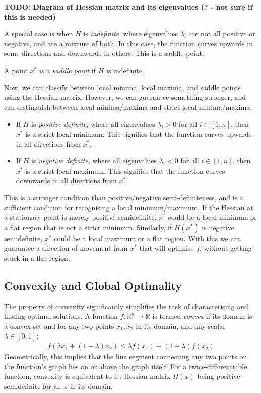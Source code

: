\textbf{TODO: Diagram of Hessian matrix and its eigenvalues (? - not sure if this is needed)}

A special case is when $H$ is \textit{indefinite}, where eigenvalues $\lambda_i$ are not all positive or negative, and are a mixture of both. In this case, the function curves upwards in some directions and downwards in others. This is a saddle point.

\begin{definition}
    A point $x^*$ is a \textit{saddle point} if $H$ is indefinite.
\end{definition}

Now, we can classify between local minima, local maxima, and saddle points using the Hessian matrix. However, we can guarantee something stronger, and can distinguish between local minima/maxima and strict local minima/maxima.

\begin{itemize}
    \item If $H$ is \textit{positive definite}, where all eigenvalues $\lambda_i > 0$ for all $i \in [1, n]$, then $x^*$ is a strict local minimum. This signifies that the function curves upwards in all directions from $x^*$.
    \item If $H$ is \textit{negative definite}, where all eigenvalues $\lambda_i < 0$ for all $i \in [1, n]$, then $x^*$ is a strict local maximum. This signifies that the function curves downwards in all directions from $x^*$.
\end{itemize}

This is a stronger condition than positive/negative semi-definiteness, and is a sufficient condition for recognising a local minimum/maximum. If the Hessian at a stationary point is merely positive semidefinite, $x^*$ could be a local minimum or a flat region that is not a strict minimum. Similarly, if $H(x^*)$ is negative semidefinite, $x^*$ could be a local maximum or a flat region. With this we can guarantee a direction of movement from $x^*$ that will optimise $f$, without getting stuck in a flat region. 

\subsection{Convexity and Global Optimality}
\label{ssec:convexity}

The property of convexity significantly simplifies the task of characterising and finding optimal solutions. A function $f: \mathbb{R}^n \to \mathbb{R}$ is termed \textit{convex} if its domain is a convex set and for any two points $x_1, x_2$ in its domain, and any scalar $\lambda \in [0, 1]$:
\begin{align}
    f(\lambda x_1 + (1-\lambda)x_2) \leq \lambda f(x_1) + (1-\lambda)f(x_2)
    \label{eq:convexity_definition}
\end{align}
Geometrically, this implies that the line segment connecting any two points on the function's graph lies on or above the graph itself. For a twice-differentiable function, convexity is equivalent to its Hessian matrix $H(x)$ being positive semidefinite for all $x$ in its domain.


